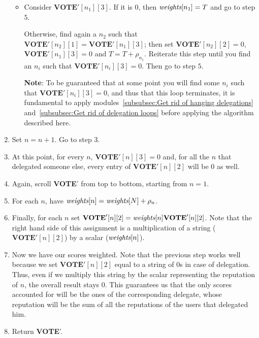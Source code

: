 \documentclass[submission, copyright,creativecommons,sharealike,noncommercial]{eptcs}
\newcommand{\Vote}{\textbf{VOTE}\xspace}
\begin{document}
\begin{enumerate}
\begin{itemize}
			\item Consider $\Vote'[n_1][3]$. If it is $0$, then $\emph{weights}[n_1] = T$ and go to step $5$. 
			
			Otherwise, find again a $n_2$ such that $\Vote'[n_2][1] = \Vote'[n_1][3]$; then set $\Vote'[n_2][2] = 0$, $\Vote'[n_1][3] = 0$ and $T = T + \rho_{n_1}$. Reiterate this step until 
			you find an $n_i$ such that $\Vote'[n_i][3]=0$. Then go to step $5$.
			
			\textbf{Note}: To be guaranteed that at some point you will find some $n_i$ such that $\Vote'[n_i][3]=0$, and thus that this loop terminates, it is fundamental to apply modules~\ref{subsubsec:Get rid of hanging delegations} and~\ref{subsubsec:Get rid of delegation loops} before applying the algorithm described here.
		\end{itemize}
	
		\item Set $n=n+1$. Go to step $3$.
	
		\item At this point, for every $n$, $\Vote'[n][3]=0$ and, for all the $n$ that delegated someone else, every entry of $\Vote'[n][2]$ will be $0$ as well.
	
		\item Again, scroll \Vote' from top to bottom, starting from $n=1$.
	
		\item For each $n$, have $\emph{weights}[n] = \emph{weights}[N] + \rho_n$.
	
		\item Finally, for each $n$ set $\Vote'[n][2] = \emph{weights}[n] \Vote'[n][2]$. Note that the right hand side of this assignment is a multiplication of a string ($\Vote'[n][2]$) by a scalar ($ \emph{weights}[n]$).
		
		\item Now we have our scores weighted. Note that the previous step works well because we set $\Vote'[n][2]$ equal to a string of $0$s in case of delegation. Thus, even if we multiply this string by the scalar representing the reputation of $n$, the overall result stays $0$. This guarantees us that the only scores accounted for will be the ones of the corresponding delegate, whose reputation will be the sum of all the reputations of the users that delegated him.
		
		\item Return \Vote'.
	\end{enumerate}
\end{document}
